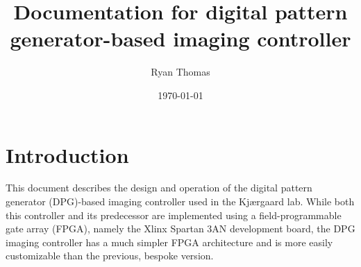\documentclass[]{article}
\begin{document}
\title{Documentation for digital pattern generator-based imaging controller}
\author{Ryan Thomas}
\date{\today}
\maketitle

\section{Introduction}
\label{sec:introduction}
This document describes the design and operation of the digital pattern generator (DPG)-based imaging controller used in the Kj{\ae}rgaard lab.  While both this controller and its predecessor are implemented using a field-programmable gate array (FPGA), namely the Xlinx Spartan 3AN development board, the DPG imaging controller has a much simpler FPGA architecture and is more easily customizable than the previous, bespoke version.
\end{document}
